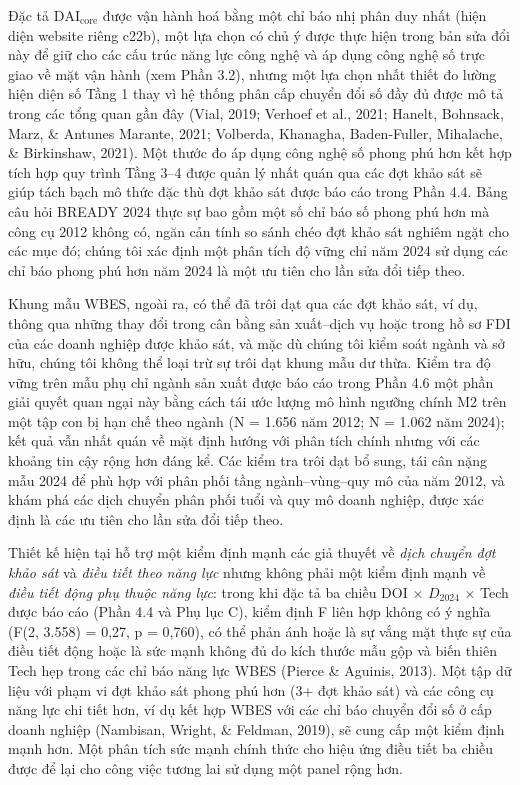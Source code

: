 \documentclass[12pt,a4paper]{article}
\begin{document}
Đặc tả \(\mathrm{DAI}_{\text{core}}\) được vận hành hoá bằng một chỉ báo
nhị phân duy nhất (hiện diện website riêng c22b), một lựa chọn có chủ ý
được thực hiện trong bản sửa đổi này để giữ cho các cấu trúc năng lực
công nghệ và áp dụng công nghệ số trực giao về mặt vận hành (xem Phần
3.2), nhưng một lựa chọn nhất thiết đo lường hiện diện số Tầng 1 thay vì
hệ thống phân cấp chuyển đổi số đầy đủ được mô tả trong các tổng quan
gần đây (Vial, 2019; Verhoef et al., 2021; Hanelt, Bohnsack, Marz, \&
Antunes Marante, 2021; Volberda, Khanagha, Baden-Fuller, Mihalache, \&
Birkinshaw, 2021). Một thước đo áp dụng công nghệ số phong phú hơn kết
hợp tích hợp quy trình Tầng 3--4 được quản lý nhất quán qua các đợt khảo
sát sẽ giúp tách bạch mô thức đặc thù đợt khảo sát được báo cáo trong
Phần 4.4. Bảng câu hỏi BREADY 2024 thực sự bao gồm một số chỉ báo số
phong phú hơn mà công cụ 2012 không có, ngăn cản tính so sánh chéo đợt
khảo sát nghiêm ngặt cho các mục đó; chúng tôi xác định một phân tích độ
vững chỉ năm 2024 sử dụng các chỉ báo phong phú hơn năm 2024 là một ưu
tiên cho lần sửa đổi tiếp theo.

Khung mẫu WBES, ngoài ra, có thể đã trôi dạt qua các đợt khảo sát, ví
dụ, thông qua những thay đổi trong cân bằng sản xuất--dịch vụ hoặc trong
hồ sơ FDI của các doanh nghiệp được khảo sát, và mặc dù chúng tôi kiểm
soát ngành và sở hữu, chúng tôi không thể loại trừ sự trôi dạt khung mẫu
dư thừa. Kiểm tra độ vững trên mẫu phụ chỉ ngành sản xuất được báo cáo
trong Phần 4.6 một phần giải quyết quan ngại này bằng cách tái ước lượng
mô hình ngưỡng chính M2 trên một tập con bị hạn chế theo ngành (N =
1.656 năm 2012; N = 1.062 năm 2024); kết quả vẫn nhất quán về mặt định
hướng với phân tích chính nhưng với các khoảng tin cậy rộng hơn đáng kể.
Các kiểm tra trôi dạt bổ sung, tái cân nặng mẫu 2024 để phù hợp với phân
phối tầng ngành--vùng--quy mô của năm 2012, và khám phá các dịch chuyển
phân phối tuổi và quy mô doanh nghiệp, được xác định là các ưu tiên cho
lần sửa đổi tiếp theo.

Thiết kế hiện tại hỗ trợ một kiểm định mạnh các giả thuyết về \emph{dịch
chuyển đợt khảo sát} và \emph{điều tiết theo năng lực} nhưng không phải
một kiểm định mạnh về \emph{điều tiết động phụ thuộc năng lực}: trong
khi đặc tả ba chiều DOI × \(D_{2024}\) × Tech được báo cáo (Phần 4.4 và
Phụ lục C), kiểm định F liên hợp không có ý nghĩa (F(2, 3.558) = 0,27, p
= 0,760), có thể phản ánh hoặc là sự vắng mặt thực sự của điều tiết động
hoặc là sức mạnh không đủ do kích thước mẫu gộp và biến thiên Tech hẹp
trong các chỉ báo năng lực WBES (Pierce \& Aguinis, 2013). Một tập dữ
liệu với phạm vi đợt khảo sát phong phú hơn (3+ đợt khảo sát) và các
công cụ năng lực chi tiết hơn, ví dụ kết hợp WBES với các chỉ báo chuyển
đổi số ở cấp doanh nghiệp (Nambisan, Wright, \& Feldman, 2019), sẽ cung
cấp một kiểm định mạnh hơn. Một phân tích sức mạnh chính thức cho hiệu
ứng điều tiết ba chiều được để lại cho công việc tương lai sử dụng một
panel rộng hơn.
\end{document}
